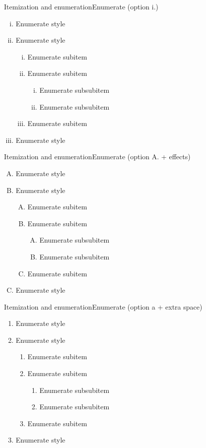 \documentclass[aspectratio=169, 11pt]{beamer}
\begin{document}
\begin{frame}{Itemization and enumeration}{Enumerate (option i.)}
\begin{enumerate}[i.]
	\item Enumerate style
	\item Enumerate style
	\begin{enumerate}[i.]
		\item Enumerate subitem
		\item Enumerate subitem
		\begin{enumerate}[i.]
			\item Enumerate subsubitem
			\item Enumerate subsubitem
		\end{enumerate}
		\item Enumerate subitem
	\end{enumerate}
	\item Enumerate style
\end{enumerate}
\end{frame}


\begin{frame}{Itemization and enumeration}{Enumerate (option A. + effects)}
\begin{enumerate}[A.]
	\item<1-5> Enumerate style
	\item<1-5> Enumerate style
	\begin{enumerate}[A.]
		\item<2-5> Enumerate subitem
		\item<3-5> Enumerate subitem
		\begin{enumerate}[A.]
			\item<3-4> Enumerate subsubitem
			\item<3-4> Enumerate subsubitem
		\end{enumerate}
		\item<4-5> Enumerate subitem
	\end{enumerate}
	\item<5> Enumerate style
\end{enumerate}
\end{frame}


\begin{frame}{Itemization and enumeration}{Enumerate (option a + extra space)}
\begin{enumerate}[a\enspace]
	\item Enumerate style
	\item Enumerate style
	\begin{enumerate}[a\enspace]
		\item Enumerate subitem
		\item Enumerate subitem
		\begin{enumerate}[a\enspace]
			\item Enumerate subsubitem
			\item Enumerate subsubitem
		\end{enumerate}
		\item Enumerate subitem
	\end{enumerate}
	\item Enumerate style
\end{enumerate}
\end{frame}
\end{document}
